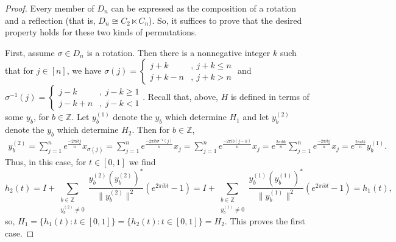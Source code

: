 \documentclass[reqno]{amsart}
\begin{document}
\begin{proof}
    Every member of $D_n$ can be expressed as the composition of a rotation and a reflection (that is, $D_n \cong C_2 \ltimes C_n$).
    So, it suffices to prove that the desired property holds for these two kinds of permutations.

    First, assume $\sigma \in D_n$ is a rotation.
    Then there is a nonnegative integer $k$ such that for $j \in [n]$, we have $\sigma(j) = \begin{cases}
        j+k &,\ j+k \leq n \\
        j+k-n &,\ j+k > n
    \end{cases}$
    and
    $\sigma^{-1}(j) = \begin{cases}
        j-k &,\ j-k \geq 1 \\
        j-k+n &,\ j-k <1
    \end{cases}$.
    Recall that, above, $H$ is defined in terms of some $y_b$, for $b \in \mathbb{Z}$.
    Let $y_b^{(1)}$ denote the $y_b$ which determine $H_1$ and let $y_b^{(2)}$ denote the $y_b$ which determine $H_2$.
    Then for $b \in \mathbb{Z}$,
    \begin{align*}
    y_b^{(2)}
    =
    \sum_{j=1}^n e^{\frac{-2\pi ibj}{n}}x_{\sigma(j)}
    =
    \sum_{j=1}^n e^{\frac{-2\pi ib \sigma^{-1}(j)}{n}} x_j
    =
    \sum_{j=1}^n e^{\frac{-2\pi ib (j-k)}{n}} x_j
    =
    e^{\frac{2\pi ibk}{n}}
    \sum_{j=1}^n e^{\frac{-2\pi ib j}{n}} x_j
    =
    e^{\frac{2\pi ibk}{n}}y_b^{(1)}.
    \end{align*}
    Thus, in this case, for $t \in [0,1]$ we find
    \[
    h_2(t) 
    = 
    I +\sum_{\substack{b \in \mathbb{Z} \\ y^{(2)}_b \neq 0}} 
    \frac{y^{(2)}_b (y^{(2)}_b)^*}{\|y^{(2)}_b\|^2}(e^{2\pi ibt} -1)
    =
    I +\sum_{\substack{b \in \mathbb{Z} \\ y^{(1)}_b \neq 0}} 
    \frac{y^{(1)}_b (y^{(1)}_b)^*}{\|y^{(1)}_b\|^2}(e^{2\pi ibt} -1)
    =
    h_1(t),
    \]
    so, $H_1 = \{h_1(t): t \in [0,1]\} = \{h_2(t) : t \in [0,1]\} = H_2$.
    This proves the first case.


\end{proof}
\end{document}
